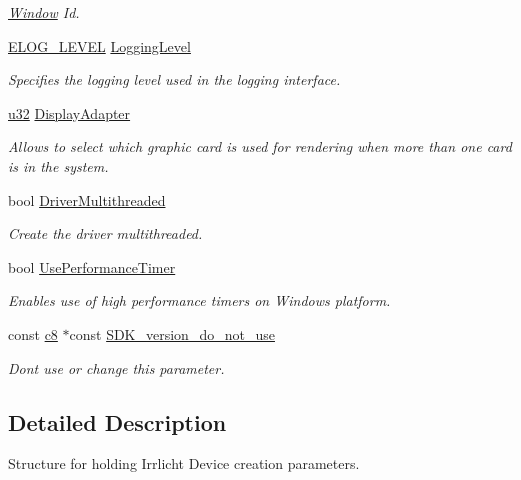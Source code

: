 \begin{DoxyCompactItemize}
\begin{DoxyCompactList}\small\item\em \hyperlink{classWindow}{Window} Id. \end{DoxyCompactList}\item 
\hyperlink{namespaceirr_aa2d1cac68606a25ed24cfffccfa30a92}{E\+L\+O\+G\+\_\+\+L\+E\+V\+EL} \hyperlink{structirr_1_1SIrrlichtCreationParameters_a2aa305ffabdd842084ddef5014b3e411}{Logging\+Level}
\begin{DoxyCompactList}\small\item\em Specifies the logging level used in the logging interface. \end{DoxyCompactList}\item 
\hyperlink{namespaceirr_a0416a53257075833e7002efd0a18e804}{u32} \hyperlink{structirr_1_1SIrrlichtCreationParameters_aa58e8699007135f9d950712f96fab730}{Display\+Adapter}
\begin{DoxyCompactList}\small\item\em Allows to select which graphic card is used for rendering when more than one card is in the system. \end{DoxyCompactList}\item 
bool \hyperlink{structirr_1_1SIrrlichtCreationParameters_a0b05e1ad03575edb74f625180860072d}{Driver\+Multithreaded}
\begin{DoxyCompactList}\small\item\em Create the driver multithreaded. \end{DoxyCompactList}\item 
bool \hyperlink{structirr_1_1SIrrlichtCreationParameters_a5bb2ea5e72eb07a049b1b7c707f405ef}{Use\+Performance\+Timer}
\begin{DoxyCompactList}\small\item\em Enables use of high performance timers on Windows platform. \end{DoxyCompactList}\item 
const \hyperlink{namespaceirr_a9395eaea339bcb546b319e9c96bf7410}{c8} $\ast$const \hyperlink{structirr_1_1SIrrlichtCreationParameters_af30f104af135b97d3e19fecaf2c10e45}{S\+D\+K\+\_\+version\+\_\+do\+\_\+not\+\_\+use}
\begin{DoxyCompactList}\small\item\em Don\textquotesingle{}t use or change this parameter. \end{DoxyCompactList}\end{DoxyCompactItemize}


\subsection{Detailed Description}
Structure for holding Irrlicht Device creation parameters. 

